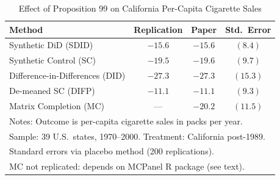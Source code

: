 \begin{table}[h]
\centering
\caption{Effect of Proposition 99 on California Per-Capita Cigarette Sales}
\label{tab:main}
\small
\begin{tabular}{lccc}
\toprule
Method & Replication & Paper & Std.\ Error \\
\midrule
Synthetic DiD (SDID)            & $-15.6$ & $-15.6$ & $(8.4)$ \\
Synthetic Control (SC)          & $-19.5$ & $-19.6$ & $(9.7)$ \\
Difference-in-Differences (DID) & $-27.3$ & $-27.3$ & $(15.3)$ \\
De-meaned SC (DIFP)             & $-11.1$ & $-11.1$ & $(9.3)$ \\
Matrix Completion (MC)          & ---     & $-20.2$ & $(11.5)$ \\
\midrule
\multicolumn{4}{l}{\footnotesize Notes: Outcome is per-capita cigarette sales in packs per year.} \\
\multicolumn{4}{l}{\footnotesize Sample: 39 U.S.\ states, 1970--2000. Treatment: California post-1989.} \\
\multicolumn{4}{l}{\footnotesize Standard errors via placebo method (200 replications).} \\
\multicolumn{4}{l}{\footnotesize MC not replicated: depends on MCPanel R package (see text).} \\
\bottomrule
\end{tabular}
\end{table}
